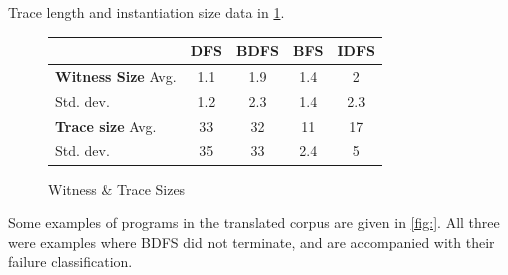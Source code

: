 Trace length and instantiation size data in \cref{fig:WitnessSize}.
\begin{figure}[h]\centering
\begin{tabular}{l|cccc}
& DFS & BDFS & BFS & IDFS\\
\hline
\textbf{Witness Size} Avg. & 1.1& 1.9&1.4&  2\\
Std. dev. & 1.2& 2.3&1.4&  2.3\\
\textbf{Trace size} Avg. & 33& 32& 11& 17\\
Std. dev. & 35& 33&2.4& 5
\end{tabular}
\caption{Witness \& Trace Sizes}
\label{fig:WitnessSize}
\end{figure}

Some examples of programs in the translated corpus are given in \cref{fig:}. All three were examples where BDFS did not terminate, and are accompanied with their failure classification.

